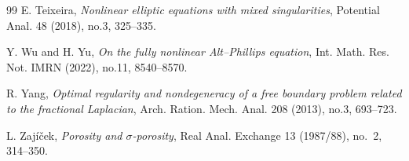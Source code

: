 \documentclass[reqno,11pt]{amsart}
\newcommand{\1}{\mathds{1}}
\numberwithin{equation}{section}
\begin{document}
\begin{thebibliography}{99}
 E. Teixeira,
{\it Nonlinear elliptic equations with mixed singularities},
Potential Anal. 48 (2018), no.3, 325--335.

 Y. Wu and H. Yu,
{\it On the fully nonlinear Alt--Phillips equation}, 
Int. Math. Res. Not. IMRN (2022), no.11, 8540--8570.

 R. Yang, 
{\it Optimal regularity and nondegeneracy of a free boundary problem related to the fractional Laplacian}, 
Arch. Ration. Mech. Anal. 208 (2013), no.3, 693--723.

 L. Zaj\'i\v cek, 
{\it Porosity and $\sigma$-porosity}, 
Real Anal. Exchange 13 (1987/88), no.~2, 314--350.

\end{thebibliography}
\end{document}
